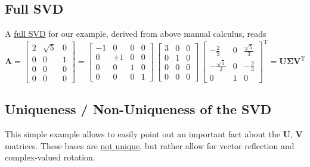 \documentclass[a4paper, 11pt]{scrartcl}
\begin{document}
\subsection{Full SVD}
A \underline{full SVD} for our example, derived from above manual calculus, reads
$$
\bm{A} =
\begin{bmatrix}
2 & \sqrt{5} & 0\\
0 & 0 & 1\\
0 & 0 & 0\\
0 & 0 & 0
\end{bmatrix}
=
\begin{bmatrix}
-1 & 0 & 0 & 0\\
0 & +1 & 0 & 0\\
0 & 0 & 1 & 0\\
0 & 0 & 0 & 1
\end{bmatrix}
\,
\begin{bmatrix}
3 & 0 & 0\\
0 &  1 & 0\\
0 & 0 & 0\\
0 & 0 & 0
\end{bmatrix}
\,
\begin{bmatrix}
-\frac{2}{3} & 0 & \frac{\sqrt{5}}{3}\\
-\frac{\sqrt{5}}{3} & 0 & -\frac{2}{3}\\
0 & 1 & 0
\end{bmatrix}^\mathrm{T}
= \bm{U} \bm{\Sigma} \bm{V}^\mathrm{T}
$$

\subsection{Uniqueness / Non-Uniqueness of the SVD}
This simple example allows to easily point out an important fact about the $\bm{U}$, $\bm{V}$ matrices.
These bases are \underline{not unique}, but rather allow for vector reflection and complex-valued rotation.
\end{document}

